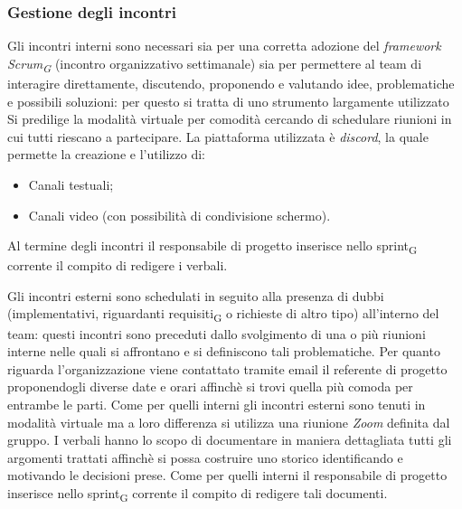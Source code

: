     \subsubsection{Gestione degli incontri}
        Gli incontri interni sono necessari sia per una corretta adozione del \textit{framework Scrum\textsubscript{G}} (incontro organizzativo settimanale)
        sia per permettere al team di interagire direttamente, discutendo, proponendo e valutando idee, problematiche e possibili 
        soluzioni: per questo si tratta di uno strumento largamente utilizzato
        \newline
        Si predilige la modalità virtuale per comodità cercando di schedulare riunioni in cui tutti riescano a partecipare.
        \newline
        La piattaforma utilizzata è \textit{discord}, la quale permette la creazione e l'utilizzo di:
        \begin{itemize}
            \item Canali testuali;
            \item Canali video (con possibilità di condivisione schermo).
        \end{itemize}
        Al termine degli incontri il responsabile di progetto inserisce nello sprint\textsubscript{G} corrente il compito di redigere i verbali. 

        Gli incontri esterni sono schedulati in seguito alla presenza di dubbi (implementativi, riguardanti requisiti\textsubscript{G} o richieste di altro tipo) all'interno del 
        team: questi incontri sono preceduti dallo svolgimento di una o più riunioni interne nelle quali si affrontano e si definiscono tali problematiche.
        \newline
        Per quanto riguarda l'organizzazione viene contattato tramite email il referente di progetto proponendogli diverse date e orari affinchè si trovi quella 
        più comoda per entrambe le parti. 
        \newline
        Come per quelli interni gli incontri esterni sono tenuti in modalità virtuale ma a loro differenza si utilizza una riunione \textit{Zoom} definita dal gruppo. 
        \newline
        I verbali hanno lo scopo di documentare in maniera dettagliata tutti gli argomenti trattati affinchè si possa costruire uno storico identificando
        e motivando le decisioni prese.
        \newline
        Come per quelli interni il responsabile di progetto inserisce nello sprint\textsubscript{G} corrente il compito di redigere tali documenti.

